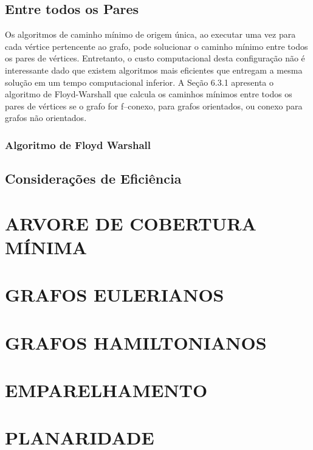 \section{Entre todos os Pares}\label{sec:entrePares}

Os algoritmos de caminho mínimo de origem única, ao executar uma vez para cada vértice pertencente ao grafo, pode solucionar o caminho mínimo entre todos os pares de vértices.
Entretanto, o custo computacional desta configuração não é interessante dado que existem algoritmos mais eficientes que entregam a mesma solução em um tempo computacional inferior.
A Seção 6.3.1 apresenta o algoritmo de Floyd-Warshall que calcula os caminhos mínimos entre todos os pares de vértices se o grafo for f–conexo, para grafos orientados, ou conexo para
grafos não orientados.

\subsection{Algoritmo de Floyd Warshall}\label{sec:floydW}

\section{Considerações de Eficiência}\label{sec:caminhoEfic}

\chapter{ARVORE DE COBERTURA MÍNIMA}\label{cap:arvCobMinima}


\chapter{GRAFOS EULERIANOS}\label{cap:grafosEulerianos}


\chapter{GRAFOS HAMILTONIANOS}\label{cap:grafosHamiltonianos}


\chapter{EMPARELHAMENTO}\label{cap:emparelhamento}


\chapter{PLANARIDADE}\label{cap:planaridade}


